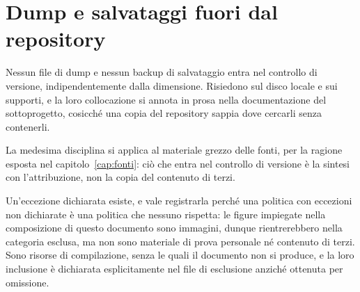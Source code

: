 \section{Dump e salvataggi fuori dal repository}

Nessun file di dump e nessun backup di salvataggio entra nel controllo di versione, indipendentemente dalla dimensione. Risiedono sul disco locale e sui supporti, e la loro collocazione si annota in prosa nella documentazione del sottoprogetto, cosicché una copia del repository sappia dove cercarli senza contenerli.

La medesima disciplina si applica al materiale grezzo delle fonti, per la ragione esposta nel capitolo~\ref{cap:fonti}: ciò che entra nel controllo di versione è la sintesi con l'attribuzione, non la copia del contenuto di terzi.

Un'eccezione dichiarata esiste, e vale registrarla perché una politica con eccezioni non dichiarate è una politica che nessuno rispetta: le figure impiegate nella composizione di questo documento sono immagini, dunque rientrerebbero nella categoria esclusa, ma non sono materiale di prova personale né contenuto di terzi. Sono risorse di compilazione, senza le quali il documento non si produce, e la loro inclusione è dichiarata esplicitamente nel file di esclusione anziché ottenuta per omissione.
